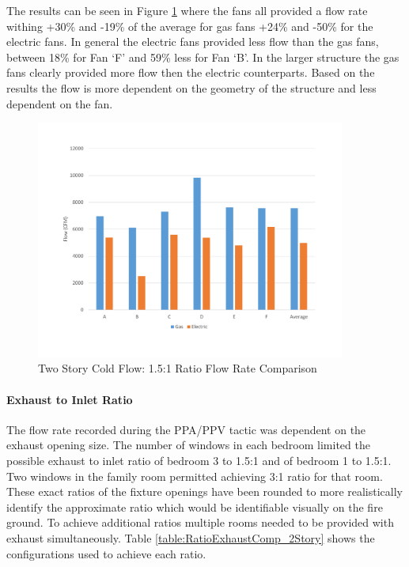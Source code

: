 \documentclass{article}
\begin{document}
The results can be seen in Figure \ref{fig:1_1RatioOutTwoStory} where the fans all provided a flow rate withing +30\% and -19\% of the average for gas fans +24\% and -50\% for the electric fans. In general the electric fans provided less flow than the gas fans, between 18\% for Fan `F' and 59\% less for Fan `B'.  In the larger structure the gas fans clearly provided more flow then the electric counterparts. Based on the results the flow is more dependent on the geometry of the structure and less dependent on the fan. 

\begin{figure}[H]
	\centering
	\includegraphics[width=4in]{0_Images/ColdFlow/Two_Story/1_1Ratio.pdf}
	\caption{Two Story Cold Flow: 1.5:1 Ratio Flow Rate Comparison}
	\label{fig:1_1RatioOutTwoStory}
\end{figure}


\paragraph{Exhaust to Inlet Ratio} \mbox{}

The flow rate recorded during the PPA/PPV tactic was dependent on the exhaust opening size. The number of windows in each bedroom limited the possible exhaust to inlet ratio of bedroom 3 to 1.5:1 and of bedroom 1 to 1.5:1.  Two windows in the family room permitted achieving 3:1 ratio for that room. These exact ratios of the fixture openings have been rounded to more realistically identify the approximate ratio which would be identifiable visually on the fire ground. To achieve additional ratios multiple rooms needed to be provided with exhaust simultaneously. Table \ref{table:RatioExhaustComp_2Story} shows the configurations used to achieve each ratio.
\end{document}
